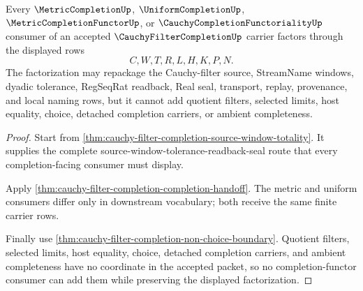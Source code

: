 \begin{theorem}
\label{thm:cauchy-filter-completion-seal-factorization-obligation}
Every $\MetricCompletionUp$, $\UniformCompletionUp$, $\MetricCompletionFunctorUp$, or $\CauchyCompletionFunctorialityUp$ consumer of an accepted $\CauchyFilterCompletionUp$ carrier factors through the displayed rows
$$
C,W,T,R,L,H,K,P,N .
$$
The factorization may repackage the Cauchy-filter source, StreamName windows, dyadic tolerance, RegSeqRat readback, Real seal, transport, replay, provenance, and local naming rows, but it cannot add quotient filters, selected limits, host equality, choice, detached completion carriers, or ambient completeness.
\end{theorem}
\begin{proof}
Start from \autoref{thm:cauchy-filter-completion-source-window-totality}. It supplies the complete source-window-tolerance-readback-seal route that every completion-facing consumer must display.

Apply \autoref{thm:cauchy-filter-completion-completion-handoff}. The metric and uniform consumers differ only in downstream vocabulary; both receive the same finite carrier rows.

Finally use \autoref{thm:cauchy-filter-completion-non-choice-boundary}. Quotient filters, selected limits, host equality, choice, detached completion carriers, and ambient completeness have no coordinate in the accepted packet, so no completion-functor consumer can add them while preserving the displayed factorization.
\end{proof}
